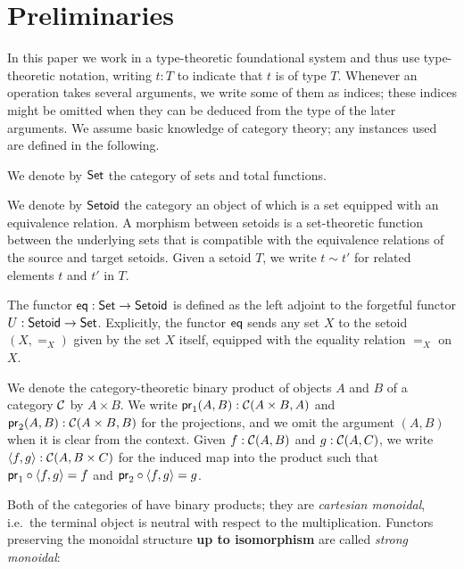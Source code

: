 \documentclass{amsart}
\begin{document}
\section{Preliminaries}\label{sec:preliminaries}

In this paper we work in a type-theoretic foundational system and thus use type-theoretic notation,  writing $t:T$ to indicate that $t$ is of type $T$. 
Whenever an operation takes several arguments, we write some of them as indices; these indices might be omitted when 
they can be deduced from the type of the later arguments.
We assume basic knowledge of category theory; any instances used are defined in the following.

\begin{definition}\label{def:set_setoid}
 We denote by $\Set$ the category of sets and total functions. 
 
 We denote by $\Setoid$ the category an object of which is a set equipped with an equivalence relation.
 A morphism between setoids is a set-theoretic function between the underlying sets that is compatible with the equivalence relations of the source and target setoids.
 Given a setoid $T$, we write $t\sim t'$ for related elements $t$ and $t'$ in $T$.
\end{definition}



\begin{definition}\label{def:eq}
 The functor $\eq : \Set\to\Setoid$ is defined as the left adjoint to the forgetful functor 
  $U : \Setoid \to \Set$.
  Explicitly, the functor $\eq$ sends any set $X$ to the setoid $(X,=_X)$ given by the set $X$ itself, equipped
  with the equality relation $=_X$ on $X$.
\end{definition}


\begin{remark}
  We denote the category-theoretic binary product of objects $A$ and $B$ of a category $\C$ by $A\times B$.
  We write $\pr_1(A,B) : \C(A\times B, A)$ and $\pr_2(A,B) :\C(A\times B, B)$ for the projections, and we omit the 
  argument $(A,B)$ when it is clear from the context.
  Given $f : \C(A, B)$ and $g : \C(A,C)$, we write $\langle f,g\rangle : \C(A,B\times C)$ for the induced map into the product such that
  $\comp{\langle f,g\rangle}{\pr_1} = f$ and $\comp{\langle f,g\rangle}{\pr_2} = g$.
\end{remark}

Both of the categories of  have binary products; they are \emph{cartesian monoidal}, i.e.\ the terminal 
object is neutral with respect to the multiplication. Functors preserving the monoidal structure \textbf{up to isomorphism}
are called \emph{strong monoidal}:
\end{document}

